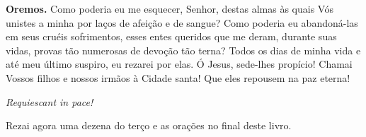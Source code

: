 \vspace{\baselineskip}\noindent \textbf{Oremos.} Como poderia eu me esquecer, Senhor, destas almas às quais Vós unistes a minha por laços de afeição e de sangue? Como poderia eu abandoná-las em seus cruéis sofrimentos, esses entes queridos que me deram, durante suas vidas, provas tão numerosas de devoção tão terna? Todos os dias de minha vida e até meu último suspiro, eu rezarei por elas. Ó Jesus, sede-lhes propício! Chamai Vossos filhos e nossos irmãos à Cidade santa! Que eles repousem na paz eterna!



\begin{center}
\textit{Requiescant in pace!}
\end{center}

Rezai agora uma dezena do terço e as orações no final deste livro.
